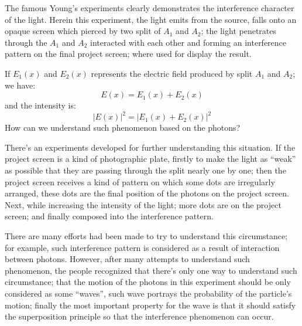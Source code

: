 The famous Young's experiments clearly demonstrates the interference
character of the light. Herein this experiment, the light emits from
the source, falls onto an opaque screen which pierced by two split
of $A_{1}$ and $A_{2}$; the light penetrates through the $A_{1}$ and
$A_{2}$ interacted with each other and forming an interference
pattern on the final project screen; where used for display the
result.

If $E_{1}(x)$ and $E_{2}(x)$ represents the electric field produced
by split $A_{1}$ and $A_{2}$; we have:
\begin{equation}\label{}
E(x)= E_{1}(x) + E_{2}(x)
\end{equation}
and the intensity is:
\begin{equation}\label{}
|E(x)|^{2}= |E_{1}(x) + E_{2}(x)|^{2}
\end{equation}
How can we understand such phenomenon based on the photons?

There's an experiments developed for further understanding this
situation. If the project screen is a kind of photographic plate,
firstly to make the light as ``weak'' as possible that they are
passing through the split nearly one by one; then the project screen
receives a kind of pattern on which some dots are irregularly
arranged, these dots are the final position of the photons on the
project screen. Next, while increasing the intensity of the light;
more dots are on the project screen; and finally composed into the
interference pattern.

There are many efforts had been made to try to understand this
circumstance; for example, such interference pattern is considered
as a result of interaction between photons. However, after many
attempts to understand such phenomenon, the people recognized that
there's only one way to understand such circumstance; that the
motion of the photons in this experiment should be only considered
as some ``waves'', such wave portrays the probability of the
particle's motion; finally the most important property for the wave
is that it should satisfy the superposition principle so that the
interference phenomenon can occur.

